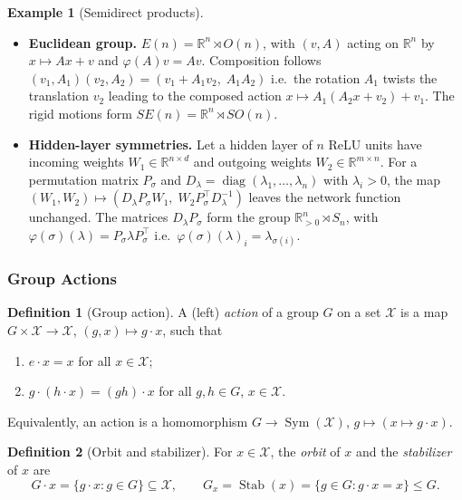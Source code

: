 \documentclass[11pt]{article}
\theoremstyle{plain}
\theoremstyle{definition}
\newtheorem{Definition}{Definition}[section]
\newtheorem{Example}{Example}[section]
\begin{document}
\begin{Example}[Semidirect products]\label{ex:semidirect-products}
\phantom{u}
\begin{itemize}
    \item \textbf{Euclidean group.} $E(n) = \mathbb{R}^n\rtimes O(n)$, with $(v,A)$ acting on $\mathbb{R}^n$ by $x\mapsto Ax+v$ and $\varphi(A)v = Av$.
    Composition follows $(v_1,A_1)(v_2,A_2) = (v_1 + A_1v_2,\; A_1A_2)$ i.e.\ the rotation $A_1$ twists the translation $v_2$ leading to the composed action $x\mapsto A_1(A_2x+v_2)+v_1$.
    The rigid motions form $SE(n) = \mathbb{R}^n\rtimes SO(n)$.
    \item \textbf{Hidden-layer symmetries.} Let a hidden layer of $n$ ReLU units have incoming weights $W_1\in\mathbb{R}^{n\times d}$ and outgoing weights $W_2\in\mathbb{R}^{m\times n}$.
    For a permutation matrix $P_\sigma$ and $D_\lambda = \operatorname{diag}(\lambda_1,\dots,\lambda_n)$ with $\lambda_i>0$, the map $(W_1,W_2)\mapsto(D_\lambda P_\sigma W_1,\; W_2P_\sigma^{\top}D_\lambda^{-1})$ leaves the network function unchanged.
    The matrices $D_\lambda P_\sigma$ form the group $\mathbb{R}_{>0}^n\rtimes S_n$, with $\varphi(\sigma)(\lambda)=P_\sigma \lambda P_\sigma^{\top}$ i.e.\ $\varphi(\sigma)(\lambda)_i = \lambda_{\sigma(i)}$.
\end{itemize}
\end{Example}

\subsubsection{Group Actions}
\label{subsec:group-actions}

\begin{Definition}[Group action]\label{def:group-action}
A (left) \emph{action} of a group $G$ on a set $\mathcal{X}$ is a map $G\times\mathcal{X}\to\mathcal{X}$, $(g,x)\mapsto g\cdot x$, such that
\begin{enumerate}[label=(A\arabic*), leftmargin=*, labelsep=0.5em]
    \item $e\cdot x = x$ for all $x\in\mathcal{X}$;
    \item $g\cdot(h\cdot x) = (gh)\cdot x$ for all $g,h\in G$, $x\in\mathcal{X}$.
\end{enumerate}
Equivalently, an action is a homomorphism $G\to\operatorname{Sym}(\mathcal{X})$, $g\mapsto(x\mapsto g\cdot x)$.
\end{Definition}

\begin{Definition}[Orbit and stabilizer]\label{def:orbit-stabilizer}
For $x\in\mathcal{X}$, the \emph{orbit} of $x$ and the \emph{stabilizer} of $x$ are
\[
    G\cdot x = \{g\cdot x : g\in G\}\subseteq\mathcal{X},
    \qquad
    G_x = \operatorname{Stab}(x) = \{g\in G : g\cdot x = x\}\leq G.
\]
\end{Definition}
\end{document}
